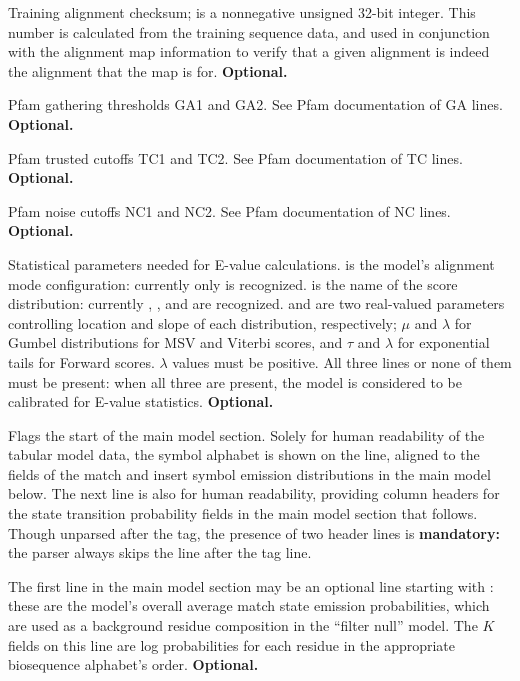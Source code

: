 \begin{sreitems}{}
\item [\monob{CKSUM <d>}] Training alignment checksum;  is
  a nonnegative unsigned 32-bit integer. This number is calculated
  from the training sequence data, and used in conjunction with the
  alignment map information to verify that a given alignment is indeed
  the alignment that the map is for. \textbf{Optional.}

\item [\monob{GA    <f> <f>}] Pfam gathering thresholds GA1 and GA2.
See Pfam documentation of GA lines. \textbf{Optional.}

\item [\monob{TC <f> <f>}] Pfam trusted cutoffs TC1 and TC2.  See
Pfam documentation of TC lines. \textbf{Optional.}

\item [\monob{NC <f> <f>}] Pfam noise cutoffs NC1 and NC2.  See Pfam
documentation of NC lines. \textbf{Optional.}

\item [\monob{STATS <s1> <s2> <f1> <f2>}] Statistical parameters
  needed for E-value calculations.  is the model's
  alignment mode configuration: currently only  is
  recognized.  is the name of the score distribution:
  currently , , and  are
  recognized.   and  are two real-valued
  parameters controlling location and slope of each distribution,
  respectively; $\mu$ and $\lambda$ for Gumbel distributions for MSV
  and Viterbi scores, and $\tau$ and $\lambda$ for exponential tails
  for Forward scores.  $\lambda$ values must be positive.  All three
  lines or none of them must be present: when all three are present,
  the model is considered to be calibrated for E-value
  statistics. \textbf{Optional.}

\item [\monob{HMM }] Flags the start of the main model
section. Solely for human readability of the tabular model data, the
symbol alphabet is shown on the  line, aligned to the fields
of the match and insert symbol emission distributions in the main
model below. The next line is also for human readability, providing
column headers for the state transition probability fields in the main
model section that follows. Though unparsed after the  tag,
the presence of two header lines is \textbf{mandatory:} the parser
always skips the line after the  tag line.

\item [\monob{COMPO <f>*K}] The first line in the main model section
may be an optional line starting with : these are the
model's overall average match state emission probabilities, which are
used as a background residue composition in the ``filter null''
model. The $K$ fields on this line are log probabilities for each
residue in the appropriate biosequence alphabet's
order. \textbf{Optional.}

\end{sreitems}

